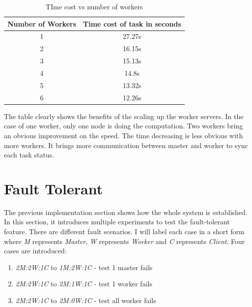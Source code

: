 \documentclass[runningheads,a4paper]{llncs}
\begin{document}
\begin{table}[htp]
\caption{TIme cost vs number of workers}
\begin{center}
\begin{tabular}{|c|c|}
\hline
Number of Workers & Time cost of task in seconds \\ \hline
1                 & 27.27s                       \\ \hline
2                 & 16.15s                       \\ \hline
3                 & 15.13s                       \\ \hline
4                 & 14.8s                        \\ \hline
5                 & 13.32s                       \\ \hline
6                 & 12.26s                       \\ \hline
\end{tabular}
\end{center}
\label{default}
\end{table}%

The table clearly shows the benefits of the scaling up the worker servers. In the case of one worker, only one node is doing the computation. Two workers bring an obvious improvement on the speed. The time decreasing is less obvious with more workers. It brings more communication between master and worker to sync each task status. 

\section{Fault Tolerant}

The previous implementation section shows how the whole system is established. In this section, it introduces multiple experiments to test the fault-tolerant feature. There are different fault scenarios. I will label each case in a short form where \emph{M} represents \emph{Master}, \emph{W} represents \emph{Worker} and \emph{C} represents \emph{Client}. Four cases are introduced:

\begin{enumerate}
\item  \emph{2M:2W:1C} to \emph{1M:2W:1C} - test 1 master fails
\item  \emph{2M:2W:1C} to \emph{2M:1W:1C} - test 1 worker fails
\item  \emph{2M:2W:1C} to \emph{2M:0W:1C} - test all worker fails
\end{enumerate}
\end{document}
